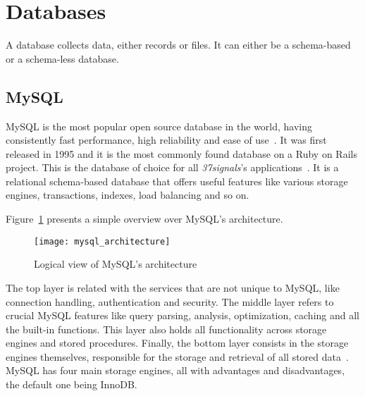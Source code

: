 \section{Databases} %
\label{tech:sec:databases}
A database collects data, either records or files. It can either be a schema-based or a schema-less database.

\subsection{MySQL}
MySQL is the most popular open source database in the world, having consistently fast performance, high reliability and ease of use~\cite{why_mysql}. It was first released in 1995 and it is the most commonly found database on a Ruby on Rails project. This is the database of choice for all \textit{37signals}'s applications~\cite{interview_dhh}.  It is a relational schema-based database that offers useful features like various storage engines, transactions, indexes, load balancing and so on.

Figure~\ref{fig:mysql_architecture} presents a simple overview over MySQL's architecture.
\begin{figure}[h]
  \centering
    \texttt{[image: mysql\_architecture]}
  \caption{Logical view of MySQL's architecture}
  \label{fig:mysql_architecture}
\end{figure}
The top layer is related with the services that are not unique to MySQL, like connection handling, authentication and security. The middle layer refers to crucial MySQL features like query parsing, analysis, optimization, caching and all the built-in functions.  This layer also holds all functionality across storage engines and stored procedures. Finally, the bottom layer consists in the storage engines themselves, responsible for the storage and retrieval of all stored data~\cite{high_performance_mysql}. MySQL has four main storage engines, all with advantages and disadvantages, the default one being InnoDB.

